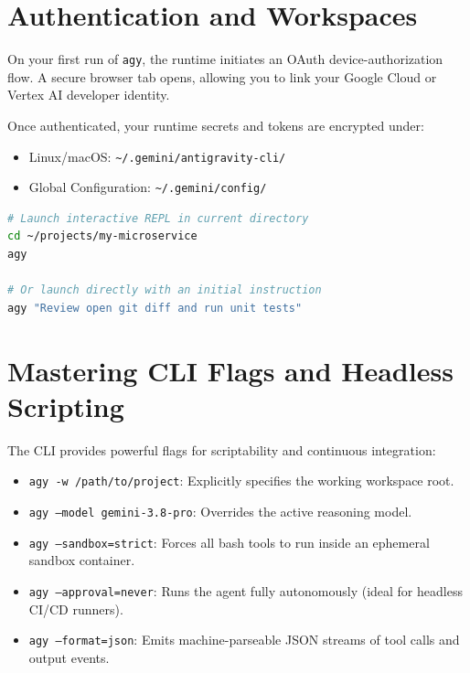 \documentclass[11pt,a4paper,oneside]{book}
\begin{document}
\section{Authentication and Workspaces}
On your first run of \texttt{agy}, the runtime initiates an OAuth device-authorization flow. A secure browser tab opens, allowing you to link your Google Cloud or Vertex AI developer identity.

Once authenticated, your runtime secrets and tokens are encrypted under:
\begin{itemize}
    \item Linux/macOS: \texttt{\textasciitilde/.gemini/antigravity-cli/}
    \item Global Configuration: \texttt{\textasciitilde/.gemini/config/}
\end{itemize}

\begin{lstlisting}[language=bash, caption={Launching your first agent session}]
# Launch interactive REPL in current directory
cd ~/projects/my-microservice
agy

# Or launch directly with an initial instruction
agy "Review open git diff and run unit tests"
\end{lstlisting}

\section{Mastering CLI Flags and Headless Scripting}
The CLI provides powerful flags for scriptability and continuous integration:
\begin{itemize}
    \item \texttt{agy -w /path/to/project}: Explicitly specifies the working workspace root.
    \item \texttt{agy --model gemini-3.8-pro}: Overrides the active reasoning model.
    \item \texttt{agy --sandbox=strict}: Forces all bash tools to run inside an ephemeral sandbox container.
    \item \texttt{agy --approval=never}: Runs the agent fully autonomously (ideal for headless CI/CD runners).
    \item \texttt{agy --format=json}: Emits machine-parseable JSON streams of tool calls and output events.
\end{itemize}
\end{document}
